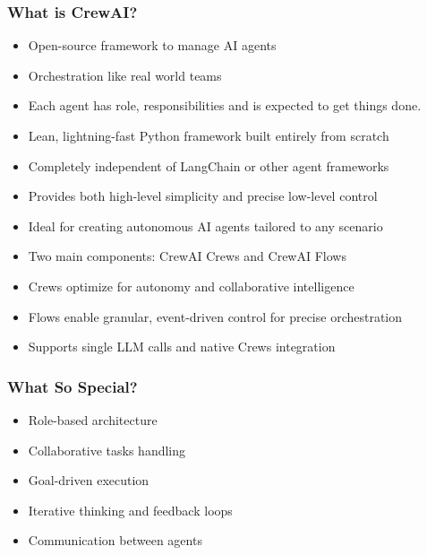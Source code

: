 \begin{frame}[fragile]\frametitle{What is CrewAI?}
      \begin{itemize}
        \item Open-source framework to manage AI agents
		\item Orchestration like real world teams
		\item Each agent has role, responsibilities and is expected to get things done.
        \item Lean, lightning-fast Python framework built entirely from scratch
        \item Completely independent of LangChain or other agent frameworks
        \item Provides both high-level simplicity and precise low-level control
        \item Ideal for creating autonomous AI agents tailored to any scenario
        \item Two main components: CrewAI Crews and CrewAI Flows
        \item Crews optimize for autonomy and collaborative intelligence
        \item Flows enable granular, event-driven control for precise orchestration
        \item Supports single LLM calls and native Crews integration
      \end{itemize}
\end{frame}



\begin{frame}[fragile]\frametitle{What So Special?}
    \begin{itemize}
        \item Role-based architecture
		\item Collaborative tasks handling
		\item Goal-driven execution
		\item Iterative thinking and feedback loops
		\item Communication between agents
    \end{itemize}
	
	
\end{frame}

